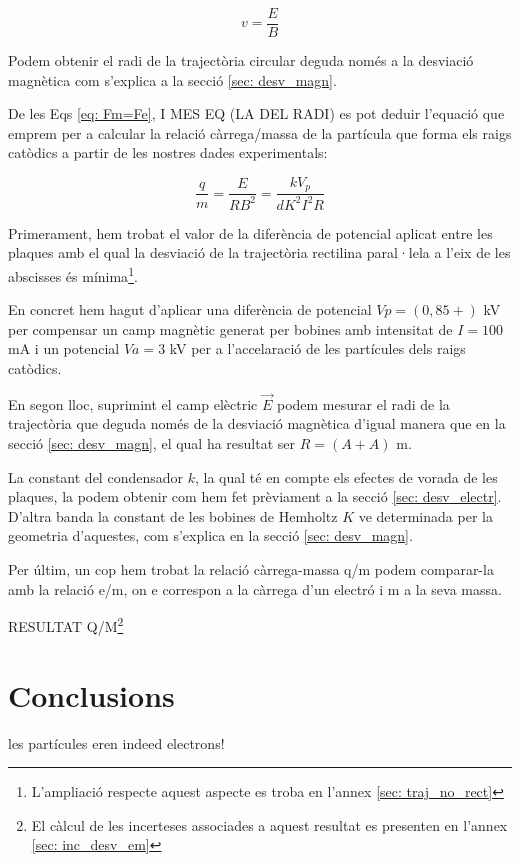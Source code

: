 \documentclass[11pt]{article}
\begin{document}
\begin{equation}
    v = \frac{E}{B}
\end{equation}

Podem obtenir el radi de la trajectòria circular deguda només a la desviació magnètica com s'explica a la secció \ref{sec: desv_magn}.

De les Eqs \eqref{eq: Fm=Fe}, I MES EQ (LA DEL RADI) es pot deduir l'equació que emprem per a calcular la relació càrrega/massa de la partícula que forma els raigs catòdics a partir de les nostres dades experimentals:

\begin{equation}
    \frac{q}{m}=\frac{E}{RB^2}=\frac{kV_p}{dK^2I^2R}
\end{equation}

Primerament, hem trobat el valor de la diferència de potencial aplicat entre les plaques amb el qual la desviació de la trajectòria rectilina paral·lela a l'eix de les abscisses és mínima\footnote{L'ampliació respecte aquest aspecte es troba en l'annex \ref{sec: traj_no_rect}}. 

En concret hem hagut d'aplicar una diferència de potencial $Vp = (0,85 + )$ kV per compensar un camp magnètic generat per bobines amb intensitat de $I = 100$ mA i un potencial $Va = 3$ kV per a l'accelaració de les partícules dels raigs catòdics.

En segon lloc, suprimint el camp elèctric $\vec{E}$ podem mesurar el radi de la trajectòria que deguda només de la desviació magnètica d'igual manera que en la secció \ref{sec: desv_magn}, el qual ha resultat ser $R = (A + A)$ m.

La constant del condensador $k$, la qual té en compte els efectes de vorada de les plaques, la podem obtenir com hem fet prèviament a la secció \ref{sec: desv_electr}. D'altra banda la constant de les bobines de Hemholtz $K$ ve determinada per la geometria d'aquestes, com s'explica en la secció \ref{sec: desv_magn}.

Per últim, un cop hem trobat la relació càrrega-massa q/m podem comparar-la amb la relació e/m, on e correspon a la càrrega d'un electró i m a la seva massa.

RESULTAT Q/M\footnote{El càlcul de les incerteses associades a aquest resultat es presenten en l'annex \ref{sec: inc_desv_em}}

\section{Conclusions}
les partícules eren indeed electrons!
\end{document}

